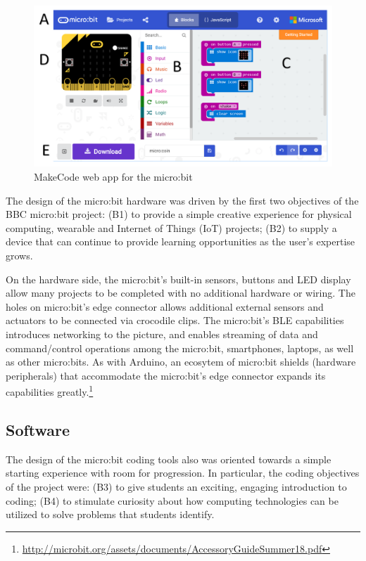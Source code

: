 \begin{figure}[t] 
  \includegraphics[width=6in]{images/webApp.png}
  \caption{\label{fig:snapshot}MakeCode web app for the micro:bit}
\end{figure}

The design of the micro:bit hardware was driven by the
first two objectives of the BBC micro:bit project:
(B1) to provide a simple creative experience for physical computing, wearable and Internet of Things (IoT) projects;
(B2) to supply a device that can continue to provide learning opportunities as the user's expertise grows.

On the hardware side, the micro:bit's built-in sensors, buttons and LED display 
allow many projects to be completed with no additional hardware or wiring. 
The holes on micro:bit's edge
connector allows additional external sensors and actuators to be connected via crocodile clips.
The micro:bit's BLE capabilities introduces networking to the
picture, and enables streaming of data and command/control operations among the micro:bit, 
smartphones, laptops, as well as other micro:bits.
As with Arduino, an ecosytem of micro:bit shields
(hardware peripherals) that accommodate the micro:bit's edge
connector expands its capabilities greatly.\footnote{
\url{http://microbit.org/assets/documents/AccessoryGuideSummer18.pdf}
}



\subsection{Software}

The design of the micro:bit coding tools also was oriented towards a 
simple starting experience with room for progression. In particular, the coding 
objectives of the project were: (B3)
to give students an exciting, engaging introduction to coding;
(B4) to stimulate curiosity about how computing technologies can be utilized 
  to solve problems that students identify. 

